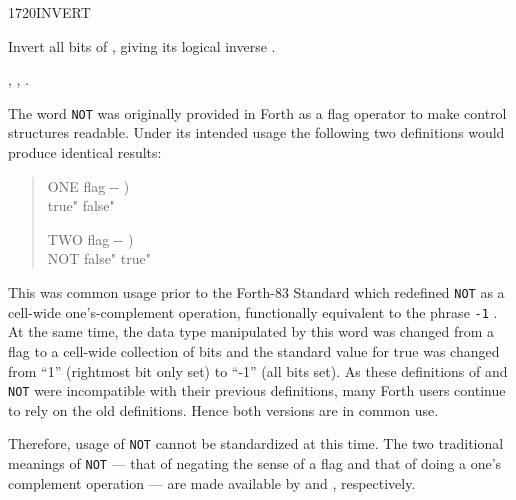 \begin{worddef}{1720}{INVERT}
\item {}

	Invert all bits of , giving its logical inverse
	.

\see {},
	,
	.

	\begin{rationale} %
		The word \texttt{NOT} was originally provided in Forth as a
		flag operator to make control structures readable. Under its
		intended usage the following two definitions would produce
		identical results:

		\begin{quote}\ttfamily
			\word{:} ONE  flag -{}- ) \\
			\tab {}
					 true"
					 false"
			\word{;}

			\word{:} TWO  flag -{}- ) \\
			\tab NOT 
					 false"
					 true"
			\word{;}
		\end{quote}

		This was common usage prior to the Forth-83 Standard which
		redefined \texttt{NOT} as a cell-wide one's-complement
		operation, functionally equivalent to the phrase \texttt{-1}
		. At the same time, the data type manipulated by
		this word was changed from a flag to a cell-wide collection of
		bits and the standard value for true was changed from ``1''
		(rightmost bit only set) to ``-1'' (all bits set). As these
		definitions of  and \texttt{NOT} were incompatible
		with their previous definitions, many Forth users continue to
		rely on the old definitions. Hence both versions are in common
		use.

		Therefore, usage of \texttt{NOT} cannot be standardized at
		this time. The two traditional meanings of \texttt{NOT} ---
		that of negating the sense of a flag and that of doing a one's
		complement operation --- are made available by  and
		, respectively.
	\end{rationale}

	\begin{testing} %
		 \\
	\end{testing}
\end{worddef}


